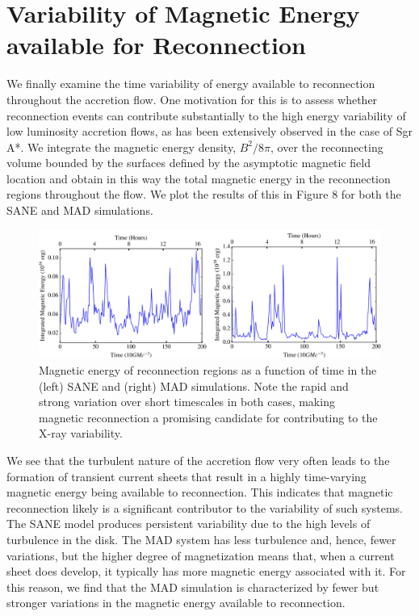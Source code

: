 \section{Variability of Magnetic Energy available for Reconnection}

We finally examine the time variability of energy available to reconnection throughout the accretion flow. One
motivation for this is to assess whether reconnection
events can contribute substantially to the high energy
variability of low luminosity accretion flows, as has been
extensively observed in the case of Sgr A*. We integrate the magnetic energy density, $B^2/8\pi$, over the reconnecting volume bounded by the surfaces defined by
the asymptotic magnetic field location and obtain in this
way the total magnetic energy in the reconnection regions throughout the flow. We plot the results of this in
Figure 8 for both the SANE and MAD simulations.

\begin{figure}[!h]
	\centering
	\includegraphics[width=\textwidth]{paper2_fig11.jpg}
	\caption{Magnetic energy of reconnection regions as a function of time in the (left) SANE and (right) MAD simulations. Note the rapid and strong variation over short timescales in both cases, making magnetic reconnection a promising candidate for contributing to the X-ray variability. }
	\label{mag_var}
\end{figure}

We see that the turbulent nature of the accretion flow
very often leads to the formation of transient current
sheets that result in a highly time-varying magnetic energy being available to reconnection. This indicates that
magnetic reconnection likely is a significant contributor
to the variability of such systems. The SANE model
produces persistent variability due to the high levels of
turbulence in the disk. The MAD system has less turbulence and, hence, fewer variations, but the higher degree
of magnetization means that, when a current sheet does
develop, it typically has more magnetic energy associated
with it. For this reason, we find that the MAD simulation is characterized by fewer but stronger variations in the magnetic energy available to reconnection.

